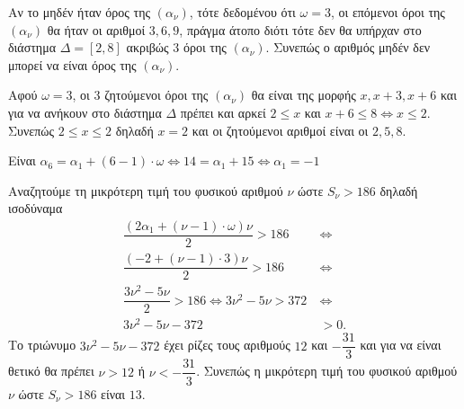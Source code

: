 
\begin{alist}
\item Αν το μηδέν ήταν όρος της $(\alpha_\nu)$, τότε δεδομένου ότι $\omega = 3$, οι επόμενοι όροι της
$(\alpha_\nu)$ θα ήταν οι αριθμοί $3, 6, 9$, πράγμα άτοπο διότι τότε δεν θα υπήρχαν στο
διάστημα $\Delta = [2, 8]$ ακριβώς $3$ όροι της $(\alpha_\nu)$. Συνεπώς ο αριθμός μηδέν δεν μπορεί
να είναι όρος της $(\alpha_\nu)$.

\item Αφού $\omega = 3$, οι $3$ ζητούμενοι όροι της $(\alpha_\nu)$ θα είναι της μορφής $x, x + 3, x + 6$ και
για να ανήκουν στο διάστημα $\Delta$ πρέπει και αρκεί $2 \le x$ και $x + 6 \le 8 \Leftrightarrow x \le 2$.
Συνεπώς $2 \le x \le 2$ δηλαδή $x = 2$ και οι ζητούμενοι αριθμοί είναι οι $2, 5, 8$.

\item 
\begin{rlist}
\item Είναι $\alpha_6 = \alpha_1 + (6 - 1) \cdot \omega \Leftrightarrow 14 = \alpha_1 + 15 \Leftrightarrow \alpha_1 = -1$

\item Αναζητούμε τη μικρότερη τιμή του φυσικού αριθμού $\nu$ ώστε $S_\nu > 186$ δηλαδή
ισοδύναμα
\begin{align*}
\dfrac{(2\alpha_1 + (\nu - 1) \cdot \omega)\nu}{2} > 186 \ &\Leftrightarrow \\
\dfrac{(-2 + (\nu - 1) \cdot 3)\nu}{2} > 186 \ &\Leftrightarrow \\
\dfrac{3\nu^2 - 5\nu}{2} > 186 \Leftrightarrow 3\nu^2 - 5\nu > 372 \ &\Leftrightarrow \\
3\nu^2 - 5\nu - 372 &> 0.
\end{align*}
Το τριώνυμο $3\nu^2 - 5\nu - 372$ έχει ρίζες τους αριθμούς $12$ και $-\dfrac{31}{3}$ και για να
είναι θετικό θα πρέπει $\nu > 12$ ή $\nu < -\dfrac{31}{3}$.
Συνεπώς η μικρότερη τιμή του φυσικού αριθμού $\nu$ ώστε $S_\nu > 186$ είναι $13$.
\end{rlist}
\end{alist}

